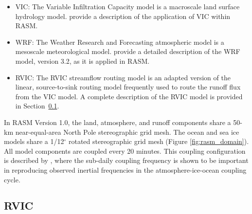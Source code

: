 \documentclass[jgrga, draft]{agutex}
\begin{document}
\begin{article}
\begin{itemize}[leftmargin=+.5in]
The POP model was initialized from a no-motion state, with climatological temperature and salinity fields derived from the University of Washington Polar Science Center Hydrographic Climatology version 3.0 \citep{Steele_2001}.
The model 75-year spin up consisted of an initial integration starting from 1948 through 1992 followed by a second integration from 1948 through 1979, both forced with $CORE.v2$ (see Section \ref{sec:data}).

\item VIC: The Variable Infiltration Capacity model \citep{Liang_1994} is a macroscale land surface hydrology model.
\citet{Hamman_2016} provide a description of the application of VIC within RASM.
\item WRF: The Weather Research and Forecasting atmospheric model \citep{Skamarock_2007} is a mesoscale meteorological model.
\citet{Cassano_2016} provide a detailed description of the WRF model, version 3.2, as it is applied in RASM.
\item RVIC: The RVIC streamflow routing model is an adapted version of the \citet{Lohmann_1996} linear, source-to-sink routing model frequently used to route the runoff flux from the VIC model.
A complete description of the RVIC model is provided in Section~\ref{sec:rvic}.
\end{itemize}

In RASM Version 1.0, the land, atmosphere, and runoff components share a 50-km near-equal-area North Pole stereographic grid mesh.
The ocean and sea ice models share a 1/12$^{\circ}$ rotated stereographic grid mesh (Figure \ref{fig:rasm_domain}).
All model components are coupled every 20 minutes.
This coupling configuration is described by \citet{Roberts_2015a}, where the sub-daily coupling frequency is shown to be important in reproducing observed inertial frequencies in the atmosphere-ice-ocean coupling cycle.

\subsection{RVIC}
\label{sec:rvic}


\end{article}
\end{document}
